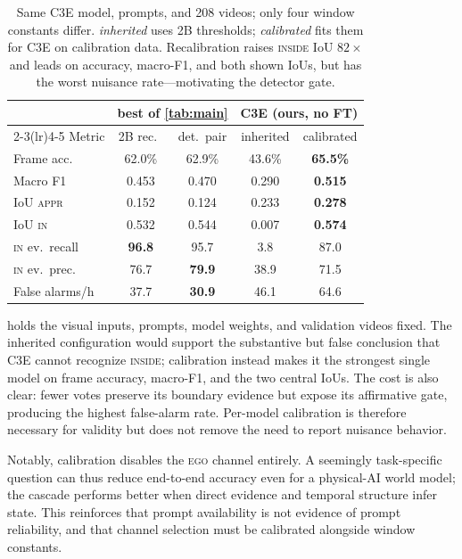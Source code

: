 \documentclass[10pt,twocolumn,letterpaper]{article}
\begin{document}
\begin{table}[t]
\centering
\footnotesize
\setlength{\tabcolsep}{3pt}
\begin{tabular}{@{}lcccc@{}}
\toprule
& \multicolumn{2}{c}{best of \cref{tab:main}} & \multicolumn{2}{c}{C3E (ours, no FT)} \\
\cmidrule(lr){2-3}\cmidrule(lr){4-5}
Metric & 2B rec.\ & det.\ pair & inherited & calibrated \\
\midrule
Frame acc.\ & 62.0\% & 62.9\% & 43.6\% & \textbf{65.5\%} \\
Macro F1 & 0.453 & 0.470 & 0.290 & \textbf{0.515} \\
IoU \textsc{appr} & 0.152 & 0.124 & 0.233 & \textbf{0.278} \\
IoU \textsc{in} & 0.532 & 0.544 & 0.007 & \textbf{0.574} \\
\textsc{in} ev.\ recall & \textbf{96.8} & 95.7 & 3.8 & 87.0 \\
\textsc{in} ev.\ prec.\ & 76.7 & \textbf{79.9} & 38.9 & 71.5 \\
False alarms/h & 37.7 & \textbf{30.9} & 46.1 & 64.6 \\
\bottomrule
\end{tabular}
\caption{Same C3E model, prompts, and 208 videos; only four window constants differ.  \emph{inherited} uses 2B thresholds; \emph{calibrated} fits them for C3E on calibration data.  Recalibration raises \textsc{inside} IoU $82\times$ and leads on accuracy, macro-F1, and both shown IoUs, but has the worst nuisance rate---motivating the detector gate.}
\label{tab:worldmodel}
\end{table}

 holds the visual inputs, prompts, model weights, and validation videos fixed.  The inherited configuration would support the substantive but false conclusion that C3E cannot recognize \textsc{inside}; calibration instead makes it the strongest single model on frame accuracy, macro-F1, and the two central IoUs.  The cost is also clear: fewer votes preserve its boundary evidence but expose its affirmative gate, producing the highest false-alarm rate.  Per-model calibration is therefore necessary for validity but does not remove the need to report nuisance behavior.

Notably, calibration disables the \textsc{ego} channel entirely.  A seemingly task-specific question can thus reduce end-to-end accuracy even for a physical-AI world model; the cascade performs better when direct evidence and temporal structure infer state.  This reinforces that prompt availability is not evidence of prompt reliability, and that channel selection must be calibrated alongside window constants.
\end{document}

